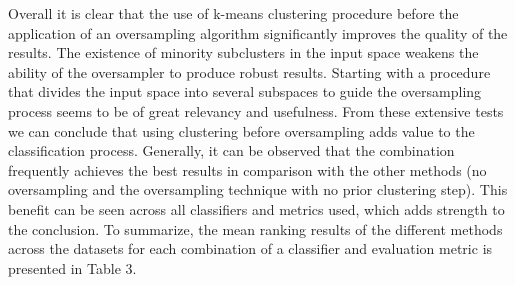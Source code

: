 \documentclass[parskip=full]{scrartcl}
\begin{document}
Overall it is clear that the use of k-means clustering procedure before the 
application of an oversampling algorithm significantly improves the quality of 
the results. The existence of minority subclusters in the input space weakens 
the ability of the oversampler to produce robust results. Starting with a 
procedure that divides the input space into several subspaces to guide the 
oversampling process seems to be of great relevancy and usefulness. From these 
extensive tests we can conclude that using clustering before oversampling adds 
value to the classification process. Generally, it can be observed that the 
combination frequently achieves the best results in comparison with the other 
methods (no oversampling and the oversampling technique with no prior 
clustering step). This benefit can be seen across all classifiers and metrics 
used, which adds strength to the conclusion. To summarize, the mean ranking 
results of the different methods across the datasets for each combination of a 
classifier and evaluation metric is presented in Table 3.



\end{document}
